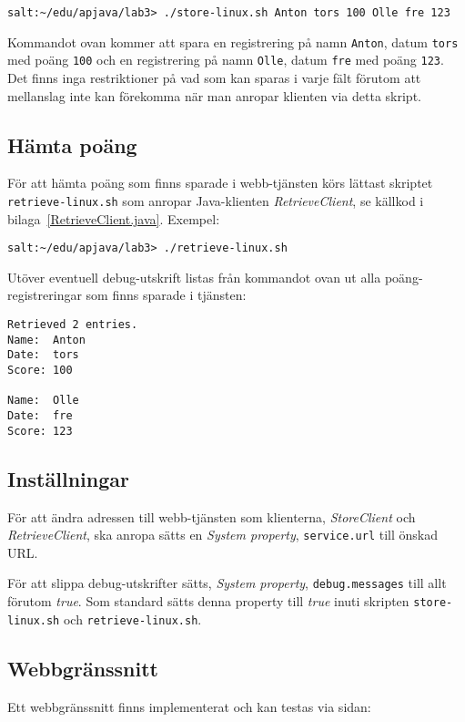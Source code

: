 \documentclass[a4paper, 12pt]{article}
\begin{document}
\begin{footnotesize}
\verb!salt:~/edu/apjava/lab3> ./store-linux.sh Anton tors 100 Olle fre 123!
\end{footnotesize}

Kommandot ovan kommer att spara en registrering på namn \verb!Anton!,
datum \verb!tors! med poäng \verb!100! och en registrering på namn
\verb!Olle!, datum \verb!fre! med poäng \verb!123!. Det finns inga
restriktioner på vad som kan sparas i varje fält förutom att
mellanslag inte kan förekomma när man anropar klienten via detta
skript.

\subsection{Hämta poäng}

För att hämta poäng som finns sparade i webb-tjänsten körs lättast
skriptet \texttt{retrieve-linux.sh} som anropar Java-klienten
\textit{RetrieveClient}, se källkod i
bilaga~\ref{RetrieveClient.java}. Exempel:

\begin{footnotesize}
\verb!salt:~/edu/apjava/lab3> ./retrieve-linux.sh !
\end{footnotesize}

Utöver eventuell debug-utskrift listas från kommandot ovan ut alla
poäng-registreringar som finns sparade i tjänsten:

\begin{footnotesize}
\begin{verbatim}
Retrieved 2 entries.
Name:  Anton
Date:  tors
Score: 100

Name:  Olle
Date:  fre
Score: 123
\end{verbatim}
\end{footnotesize}

\subsection{Inställningar}
För att ändra adressen till webb-tjänsten som klienterna,
\textit{StoreClient} och \textit{RetrieveClient}, ska anropa sätts en
\textit{System property}, \verb!service.url! till önskad URL.

För att slippa debug-utskrifter sätts, \textit{System property}, 
\verb!debug.messages! till allt förutom \textit{true}. Som standard
sätts denna property till \textit{true} inuti skripten
\verb!store-linux.sh! och \verb!retrieve-linux.sh!.

\subsection{Webbgränssnitt}
Ett webbgränssnitt finns implementerat och kan testas via sidan:
\end{document}
